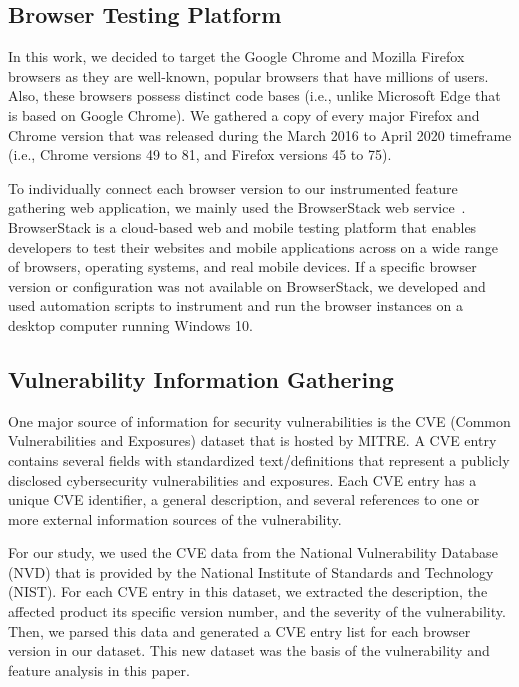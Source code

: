 \subsection{Browser Testing Platform}

In this work, we decided to target the Google Chrome and Mozilla
Firefox browsers as they are well-known, popular browsers that have
millions of users. Also, these browsers possess distinct code bases
(i.e., unlike Microsoft Edge that is based on Google Chrome). We
gathered a copy of every major Firefox and Chrome version that was
released during the March 2016 to April 2020 timeframe (i.e., Chrome
versions 49 to 81, and Firefox versions 45 to 75).

To individually connect each browser version to our instrumented
feature gathering web application, we mainly used the BrowserStack web
service~\cite{browserstack}. BrowserStack is a cloud-based web and mobile testing platform
that enables developers to test their websites and mobile applications
across on a wide range of browsers, operating systems, and real mobile
devices. If a specific browser version or configuration was not
available on BrowserStack, we developed and used automation scripts to
instrument and run the browser instances on a desktop computer running
Windows 10.




\subsection{Vulnerability Information Gathering}

One major source of information for security vulnerabilities is the
CVE (Common Vulnerabilities and Exposures) dataset that is hosted by
MITRE. A CVE entry contains several fields with standardized text/definitions that represent a publicly disclosed cybersecurity
vulnerabilities and exposures. Each CVE entry has a unique CVE
identifier, a general description, and several references to one or
more external information sources of the vulnerability.

For our study, we used the CVE data from the National Vulnerability
Database (NVD) that is provided by the National Institute of Standards
and Technology (NIST). For each CVE entry in this dataset, we
extracted the description, the affected product its specific version
number, and the severity of the vulnerability. Then, we parsed this
data and generated a CVE entry list for each browser version in our
dataset. This new dataset was the basis of the vulnerability and
feature analysis in this paper.

